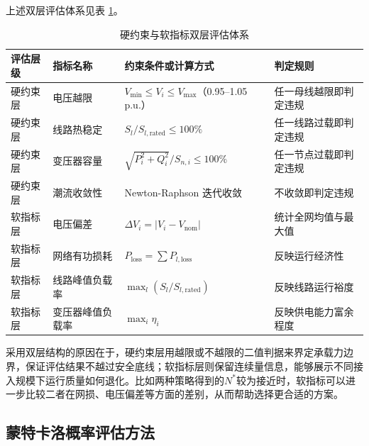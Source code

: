 \documentclass[10pt,a4paper]{article}
\numberwithin{equation}{section}
\numberwithin{table}{section}
\numberwithin{figure}{section}
\begin{document}
    上述双层评估体系见表 \ref{tab:dual_layer_assessment}。

    \begin{table}[htbp]
        \centering
        \caption{硬约束与软指标双层评估体系}
        \label{tab:dual_layer_assessment}
        \setlength{\tabcolsep}{4pt}
        \renewcommand{\arraystretch}{1.3}
        \begin{tabularx}{\textwidth}{>{\centering\arraybackslash}p{1.9cm} >{\centering\arraybackslash}p{2.3cm} >{\raggedright\arraybackslash}X >{\raggedright\arraybackslash}p{3.3cm}}
            \toprule
            评估层级 & 指标名称 & 约束条件或计算方式 & 判定规则 \\
            \midrule
            硬约束层 & 电压越限 & $V_{\min} \leq V_i \leq V_{\max}$（0.95--1.05 p.u.） & 任一母线越限即判定违规 \\
            硬约束层 & 线路热稳定 & $S_l / S_{l,\text{rated}} \leq 100\%$ & 任一线路过载即判定违规 \\
            硬约束层 & 变压器容量 & $\sqrt{P_i^2 + Q_i^2} / S_{n,i} \leq 100\%$ & 任一节点过载即判定违规 \\
            硬约束层 & 潮流收敛性 & Newton-Raphson 迭代收敛 & 不收敛即判定违规 \\
            软指标层 & 电压偏差 & $\Delta V_i = \lvert V_i - V_{\text{nom}} \rvert$ & 统计全网均值与最大值 \\
            软指标层 & 网络有功损耗 & $P_{\text{loss}} = \sum P_{l,\text{loss}}$ & 反映运行经济性 \\
            软指标层 & 线路峰值负载率 & $\max_l(S_l / S_{l,\text{rated}})$ & 反映线路运行裕度 \\
            软指标层 & 变压器峰值负载率 & $\max_i \eta_i$ & 反映供电能力富余程度 \\
            \bottomrule
        \end{tabularx}
    \end{table}

    采用双层结构的原因在于，硬约束层用越限或不越限的二值判据来界定承载力边界，保证评估结果不越过安全底线；软指标层则保留连续量信息，能够展示不同接入规模下运行质量如何退化。比如两种策略得到的$N^*$较为接近时，软指标可以进一步比较二者在网损、电压偏差等方面的差别，从而帮助选择更合适的方案。

    \subsection{蒙特卡洛概率评估方法}
\end{document}
